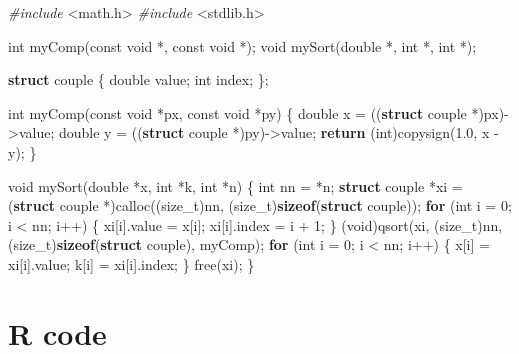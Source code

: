 \documentclass[12pt,]{article}
\newenvironment{Shaded}{\begin{snugshade}}{\end{snugshade}}
\newcommand{\KeywordTok}[1]{\textcolor[rgb]{0.13,0.29,0.53}{\textbf{#1}}}
\newcommand{\DataTypeTok}[1]{\textcolor[rgb]{0.13,0.29,0.53}{#1}}
\newcommand{\DecValTok}[1]{\textcolor[rgb]{0.00,0.00,0.81}{#1}}
\newcommand{\FloatTok}[1]{\textcolor[rgb]{0.00,0.00,0.81}{#1}}
\newcommand{\ImportTok}[1]{#1}
\newcommand{\ControlFlowTok}[1]{\textcolor[rgb]{0.13,0.29,0.53}{\textbf{#1}}}
\newcommand{\PreprocessorTok}[1]{\textcolor[rgb]{0.56,0.35,0.01}{\textit{#1}}}
\newcommand{\NormalTok}[1]{#1}
\begin{document}
\begin{Shaded}
\begin{Highlighting}[]
\PreprocessorTok{#include }\ImportTok{<math.h>}
\PreprocessorTok{#include }\ImportTok{<stdlib.h>}

\DataTypeTok{int}\NormalTok{ myComp(}\DataTypeTok{const} \DataTypeTok{void}\NormalTok{ *, }\DataTypeTok{const} \DataTypeTok{void}\NormalTok{ *);}
\DataTypeTok{void}\NormalTok{ mySort(}\DataTypeTok{double}\NormalTok{ *, }\DataTypeTok{int}\NormalTok{ *, }\DataTypeTok{int}\NormalTok{ *);}

\KeywordTok{struct}\NormalTok{ couple \{}
    \DataTypeTok{double}\NormalTok{ value;}
    \DataTypeTok{int}\NormalTok{ index;}
\NormalTok{\};}

\DataTypeTok{int}\NormalTok{ myComp(}\DataTypeTok{const} \DataTypeTok{void}\NormalTok{ *px, }\DataTypeTok{const} \DataTypeTok{void}\NormalTok{ *py) \{}
    \DataTypeTok{double}\NormalTok{ x = ((}\KeywordTok{struct}\NormalTok{ couple *)px)->value;}
    \DataTypeTok{double}\NormalTok{ y = ((}\KeywordTok{struct}\NormalTok{ couple *)py)->value;}
    \ControlFlowTok{return}\NormalTok{ (}\DataTypeTok{int}\NormalTok{)copysign(}\FloatTok{1.0}\NormalTok{, x - y);}
\NormalTok{\}}

\DataTypeTok{void}\NormalTok{ mySort(}\DataTypeTok{double}\NormalTok{ *x, }\DataTypeTok{int}\NormalTok{ *k, }\DataTypeTok{int}\NormalTok{ *n) \{}
    \DataTypeTok{int}\NormalTok{ nn = *n;}
    \KeywordTok{struct}\NormalTok{ couple *xi =}
\NormalTok{        (}\KeywordTok{struct}\NormalTok{ couple *)calloc((}\DataTypeTok{size_t}\NormalTok{)nn, (}\DataTypeTok{size_t}\NormalTok{)}\KeywordTok{sizeof}\NormalTok{(}\KeywordTok{struct}\NormalTok{ couple));}
    \ControlFlowTok{for}\NormalTok{ (}\DataTypeTok{int}\NormalTok{ i = }\DecValTok{0}\NormalTok{; i < nn; i++) \{}
\NormalTok{        xi[i].value = x[i];}
\NormalTok{        xi[i].index = i + }\DecValTok{1}\NormalTok{;}
\NormalTok{    \}}
\NormalTok{    (}\DataTypeTok{void}\NormalTok{)qsort(xi, (}\DataTypeTok{size_t}\NormalTok{)nn, (}\DataTypeTok{size_t}\NormalTok{)}\KeywordTok{sizeof}\NormalTok{(}\KeywordTok{struct}\NormalTok{ couple), myComp);}
    \ControlFlowTok{for}\NormalTok{ (}\DataTypeTok{int}\NormalTok{ i = }\DecValTok{0}\NormalTok{; i < nn; i++) \{}
\NormalTok{        x[i] = xi[i].value;}
\NormalTok{        k[i] = xi[i].index;}
\NormalTok{    \}}
\NormalTok{    free(xi);}
\NormalTok{\}}
\end{Highlighting}
\end{Shaded}

\section{R code}\label{r-code}
\end{document}
